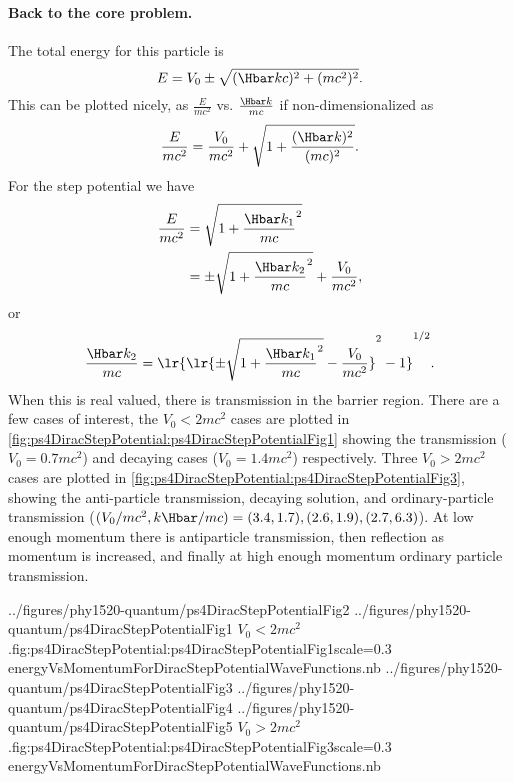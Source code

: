 \paragraph{Back to the core problem.}

The total energy for this particle is
%
\begin{equation}\label{eqn:gradQuantumProblemSet4Problem3:560}
E = V_0 \pm \sqrt{(\Hbar k c)^2 + (m c^2)^2}.
\end{equation}
%
This can be plotted nicely, as \( \frac{E}{m c^2} \) vs. \( \frac{\Hbar k}{m c} \) if non-dimensionalized as
%
\begin{equation}\label{eqn:gradQuantumProblemSet4Problem3:580}
\frac{E}{m c^2} = \frac{V_0}{m c^2} + \sqrt{1 + \frac{(\Hbar k)^2}{(m c)^2} }.
\end{equation}
%
For the step potential we have
%
\begin{equation}\label{eqn:gradQuantumProblemSet4Problem3:600}
\begin{aligned}
\frac{E}{m c^2}
&= \sqrt{ 1 + {\frac{ \Hbar k_1}{m c} }^2 }
\\ &= \pm \sqrt{ 1 + {\frac{ \Hbar k_2}{m c} }^2 } + \frac{V_0}{m c^2},
\end{aligned}
\end{equation}
%
or
\begin{equation}\label{eqn:gradQuantumProblemSet4Problem3:620}
\frac{ \Hbar k_2}{m c}
=
\lr{ \lr{ \pm \sqrt{ 1 + {\frac{ \Hbar k_1}{m c} }^2 } - \frac{V_0}{m c^2} }^2 - 1 }^{1/2}.
\end{equation}
%
When this is real valued, there is transmission in the barrier region.  There are a few cases of interest, the \( V_0 < 2 m c^2 \) cases are plotted in \cref{fig:ps4DiracStepPotential:ps4DiracStepPotentialFig1} showing the transmission (\( V_0 = 0.7 m c^2 \)) and decaying cases (\( V_0 = 1.4 m c^2 \)) respectively.
Three \( V_0 > 2 m c^2 \) cases are plotted in \cref{fig:ps4DiracStepPotential:ps4DiracStepPotentialFig3},
showing the
anti-particle transmission,
decaying solution,
and ordinary-particle transmission
(\( (V_0/m c^2,k \Hbar/m c) = (3.4,1.7), (2.6,1.9), (2.7,6.3) \)).  At low enough momentum there is antiparticle transmission, then reflection as momentum is increased, and finally at high enough momentum ordinary particle transmission.

\mathImageTwoFigures
{../figures/phy1520-quantum/ps4DiracStepPotentialFig2}
{../figures/phy1520-quantum/ps4DiracStepPotentialFig1}
{\( V_0 < 2 m c^2 \).}{fig:ps4DiracStepPotential:ps4DiracStepPotentialFig1}{scale=0.3}
{energyVsMomentumForDiracStepPotentialWaveFunctions.nb}
\mathImageThreeFiguresOneLine
{../figures/phy1520-quantum/ps4DiracStepPotentialFig3}
{../figures/phy1520-quantum/ps4DiracStepPotentialFig4}
{../figures/phy1520-quantum/ps4DiracStepPotentialFig5}
{\( V_0 > 2 m c^2 \).}{fig:ps4DiracStepPotential:ps4DiracStepPotentialFig3}{scale=0.3}
{energyVsMomentumForDiracStepPotentialWaveFunctions.nb}

